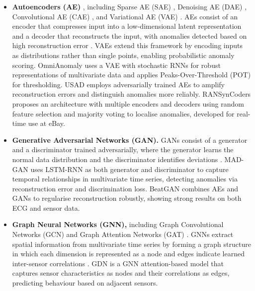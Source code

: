 \documentclass[twoside,11pt,openright]{report}
\begin{document}
\begin{itemize}
    \item \textbf{Autoencoders (AE)} \citep{kramer1991nonlinear}, including Sparse AE (SAE) \citep{ng2011sparse}, 
    Denoising AE (DAE) \citep{vincent2008extracting}, 
    Convolutional AE (CAE) \citep{noh2015learning}, and Variational AE (VAE) \citep{kingma2014auto}. 
    AEs consist of an encoder that 
    compresses input into a low-dimensional latent representation and a decoder that 
    reconstructs the input, with anomalies detected based on high reconstruction error 
    \citep{darban2024survey}. VAEs extend this framework by encoding inputs as 
    distributions rather than single points, enabling probabilistic anomaly scoring. 
    OmniAnomaly \citep{su2019smd} uses a VAE with stochastic RNNs for robust 
    representations of multivariate data and applies Peaks-Over-Threshold (POT) \citep{siffer2017pot} for thresholding. USAD 
    \citep{audibert2020usad} employs adversarially trained AEs to amplify reconstruction 
    errors and distinguish anomalies more reliably. RANSynCoders \citep{abdulaal2021psm} 
    proposes an architecture with multiple encoders and decoders using random feature 
    selection and majority voting to localise anomalies, developed for real-time use at eBay.

    \item \textbf{Generative Adversarial Networks (GAN).} GANs consist of a generator and 
    a discriminator trained adversarially, where the generator learns the normal data 
    distribution and the discriminator identifies deviations \citep{darban2024survey}. 
    MAD-GAN \citep{li2019madgan} uses LSTM-RNN as both generator and discriminator to 
    capture temporal relationships in multivariate time series, detecting anomalies via 
    reconstruction error and discrimination loss. BeatGAN \citep{zhou2019beatgan} combines 
    AEs and GANs to regularise reconstruction robustly, showing strong results on both ECG 
    and sensor data.

    \item \textbf{Graph Neural Networks (GNN),} including Graph Convolutional Networks 
    (GCN) \citep{kipf2017semi} and Graph Attention Networks (GAT) \citep{velickovic2018graph}. 
    GNNs extract spatial information from 
    multivariate time series by forming a graph structure in which each dimension is 
    represented as a node and edges indicate learned inter-sensor correlations 
    \citep{darban2024survey}. GDN \citep{deng2021graph} is a GNN attention-based model 
    that captures sensor characteristics as nodes and their correlations as edges, predicting 
    behaviour based on adjacent sensors. 


\end{itemize}
\end{document}
